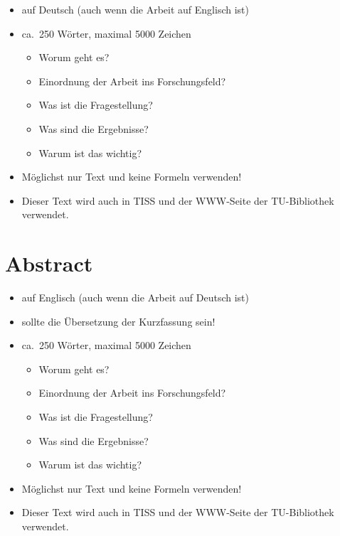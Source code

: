 \documentclass[a4paper,11pt,bibliography=totoc,listof=totoc,headinclude=true,cleardoublepage=empty,oneside]{NumPDEsThesis}
\begin{document}
\begin{itemize}
  \item auf Deutsch (auch wenn die Arbeit auf Englisch ist)
  \item ca.\ 250 Wörter, maximal 5000 Zeichen
        \begin{itemize}
          \item Worum geht es?
          \item Einordnung der Arbeit ins Forschungsfeld?
          \item Was ist die Fragestellung?
          \item Was sind die Ergebnisse?
          \item Warum ist das wichtig?
        \end{itemize}
  \item Möglichst nur Text und keine Formeln verwenden!
  \item Dieser Text wird auch in TISS und der WWW-Seite der TU-Bibliothek verwendet.
\end{itemize}

\cleardoublepage


\chapter*{Abstract}
\thispagestyle{empty}

{

  \begin{itemize}
    \item auf Englisch (auch wenn die Arbeit auf Deutsch ist)
    \item sollte die Übersetzung der Kurzfassung sein!
    \item ca.\ 250 Wörter, maximal 5000 Zeichen
          \begin{itemize}
            \item Worum geht es?
            \item Einordnung der Arbeit ins Forschungsfeld?
            \item Was ist die Fragestellung?
            \item Was sind die Ergebnisse?
            \item Warum ist das wichtig?
          \end{itemize}
    \item Möglichst nur Text und keine Formeln verwenden!
    \item Dieser Text wird auch in TISS und der WWW-Seite der TU-Bibliothek verwendet.
  \end{itemize}

}
\end{document}
